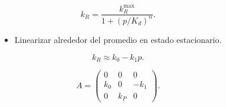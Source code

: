 \documentclass[xcolor=dvipsnames]{beamer}
\begin{document}
\begin{frame}
\begin{columns}[c]
\begin{itemize}
\begin{equation*}
k_R = \frac{k_R^{\text{max}}}{1+(p/K_d)^n}.
\end{equation*}

\item Linearizar alrededor del promedio en estado estacionario.

\begin{equation*}
k_R \approx k_0-k_1p.
\end{equation*}

\vspace{-1mm}

\begin{equation*}
A = 
\begin{pmatrix}
0 & 0 & 0 \\
k_0 & 0 & -k_1 \\
0 & k_P & 0
\end{pmatrix}.
\end{equation*}
\end{itemize}
\end{columns}
\end{frame}
\end{document}
